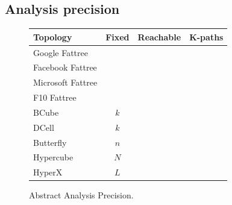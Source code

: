 \documentclass{sig-alternate-10pt}
\newcommand{\cmark}{\ding{51}}
\newcommand{\xmark}{\ding{55}}
\begin{document}
\subsection{Analysis precision}

\begin{figure}[t!]
  \begin{center}
      \begin{tabular}{| l | c | c | c |}
      \hline
      \textbf{Topology} & \textbf{Fixed} & \textbf{Reachable} & \textbf{K-paths} \\ \hline
      Google Fattree & & \cmark & \cmark  \\ \hline
      Facebook Fattree & & \cmark & \cmark \\ \hline
      Microsoft Fattree & & & \\ \hline
      F10 Fattree & & \cmark & \cmark \\ \hline
      BCube & $k$ & \cmark & \xmark \\ \hline
      DCell & $k$ & \cmark & \xmark \\ \hline
      Butterfly & $n$ & \cmark & \cmark \\ \hline
      Hypercube & $N$ & \cmark & \cmark \\ \hline
      HyperX & $L$ & \cmark & \cmark \\ \hline
      \end{tabular}
  \end{center}
  \caption{Abstract Analysis Precision.}
  \label{fig:analysis-precision}
\end{figure}

\end{document}
